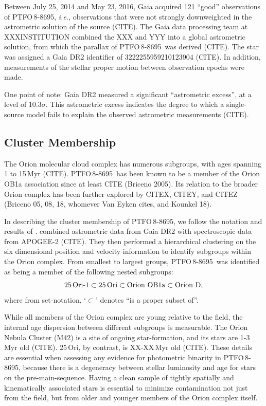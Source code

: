 \documentclass[12pt,twocolumn,tighten]{aastex62}
\newcommand{\ptfo}{PTFO$\,$8-8695}
\begin{document}
Between July 25, 2014 and May 23, 2016, Gaia acquired 121 ``good''
observations of \ptfo, {\it i.e.}, observations that were not strongly
downweighted in the astrometric solution of the source (CITE).
The Gaia data processing team at XXXINSTITUTION combined the XXX and
YYY into a global astrometric solution, from which the parallax of 
\ptfo\ was derived (CITE).
The star was assigned a Gaia DR2 identifier of 3222255959210123904
(CITE).
In addition, measurements of the stellar proper motion between
observation epochs were made.

One point of note:
Gaia DR2 measured a significant ``astrometric excess'', at a level of
10.3$\sigma$.
This astrometric excess indicates the degree
to which a single-source model fails to explain the observed astrometric
measurements (CITE).

\subsection{Cluster Membership}
The Orion molecular cloud complex has numerous subgroups, with ages
spanning 1 to 15$\,$Myr (CITE).
\ptfo\ has been known to be a member of the Orion OB1a association
since at least CITE (Briceno 2005).
Its relation to the broader Orion complex has been further explored by
CITEX, CITEY, and CITEZ (Briceno 05, 08, 18, whomever Van Eyken cites,
and Kounkel 18).

In describing the cluster membership of \ptfo, we follow the notation
and results of \citet{kounkel_apogee2_2018}.
\citet{kounkel_apogee2_2018} combined astrometric data from Gaia DR2
with spectroscopic data from APOGEE-2 (CITE).  They then performed a
hierarchical clustering on the six dimensional position and velocity
information to identify subgroups within the Orion complex.  From
smallest to largest groups, \ptfo\ was identified as being a member of
the following nested subgroups:
\begin{equation}
  {\rm 25\,Ori\text{-}1}
  \subset {\rm 25\,Ori}
  \subset {\rm Orion\ OB1a}
  \subset {\rm Orion\ D},
\end{equation}
where from set-notation, `$\subset$' denotes ``is a proper subset of''.

While all members of the Orion complex are young relative to the
field, the internal age dispersion between different subgroups is
measurable.  The Orion Nebula Cluster (M42) is a site of ongoing
star-formation, and its stars are 1-3$\,$Myr old (CITE).
25$\,$Ori, by contrast, is XX-XX$\,$Myr old (CITE).  These details
are essential when assessing any evidence for photometric binarity in
\ptfo, because there is a degeneracy between stellar luminosity and
age for stars on the pre-main-sequence.  Having a clean sample of
tightly spatially and kinematically associated stars is essential to
minimize contamination not just from the field, but from older and
younger members of the Orion complex itself.
\end{document}
